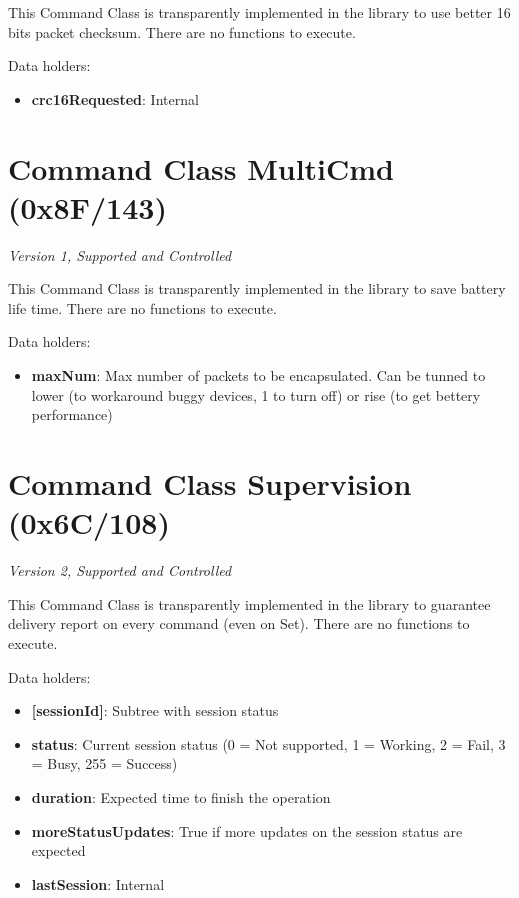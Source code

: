 This Command Class is transparently implemented in the library to use better 16 bits packet checksum. There are no functions to execute.
\newline

\noindent
Data holders:

\begin{itemize}
\item \textbf{crc16Requested}: Internal
\end{itemize}


\section{Command Class MultiCmd (0x8F/143)}

\textit{Version 1, Supported and Controlled}
\newline

This Command Class is transparently implemented in the library to save battery life time. There are no functions to execute.
\newline

\noindent
Data holders:

\begin{itemize}
\item \textbf{maxNum}: Max number of packets to be encapsulated. Can be tunned to lower (to workaround buggy devices, 1 to turn off) or rise (to get bettery performance)
\end{itemize}


\section{Command Class Supervision (0x6C/108)}

\textit{Version 2, Supported and Controlled}
\newline

This Command Class is transparently implemented in the library to guarantee delivery report on every command (even on Set). There are no functions to execute.
\newline

\noindent
Data holders:

\begin{itemize}
\item \textbf{[sessionId]}: Subtree with session status
\item \qquad\textbf{status}: Current session status (0 = Not supported, 1 = Working, 2 = Fail, 3 = Busy, 255 = Success)
\item \qquad\textbf{duration}: Expected time to finish the operation
\item \qquad\textbf{moreStatusUpdates}: True if more updates on the session status are expected
\item \textbf{lastSession}: Internal
\end{itemize}


